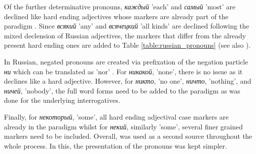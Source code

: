 \documentclass[11pt,a4paper,twoside,openright]{scrbook}
\begin{document}
Of the further determinative pronouns, \foreignlanguage{russian}{\textit{каждый}} 'each' and \foreignlanguage{russian}{\textit{самый}} 'most' are declined like hard ending adjectives whose markers are already part of the paradigm \citep{wade2020russ}. Since \foreignlanguage{russian}{\textit{всякий}} 'any' and \foreignlanguage{russian}{\textit{всячецкий}} 'all kinds' are declined following the mixed declension of Russian adjectives, the markers that differ from the already present hard ending ones are added to Table \ref{table:russian_pronouns} (see also \citet{kohls2009russ}).

In Russian, negated pronouns are created via prefixation of the negation particle \foreignlanguage{russian}{\textit{ни}} which can be translated as 'nor' \citep{wade2020russ}. For \foreignlanguage{russian}{\textit{никакой}}, 'none', there is no issue as it declines like a hard adjective. However, for \foreignlanguage{russian}{\textit{никто}}, 'no one', \foreignlanguage{russian}{\textit{ничто}}, 'nothing', and \foreignlanguage{russian}{\textit{ничей}}, 'nobody', the full word forms need to be added to the paradigm as was done for the underlying interrogatives. 

Finally, for \foreignlanguage{russian}{\textit{некоторый}}, 'some', all hard ending adjectival case markers are already in the paradigm whilst for \foreignlanguage{russian}{\textit{некий}}, similarly 'some', several finer grained markers need to be included. Overall, \citet{kohls2009russ} was used as a second source throughout the whole process. In this, the presentation of the pronouns was kept simpler.
\end{document}
